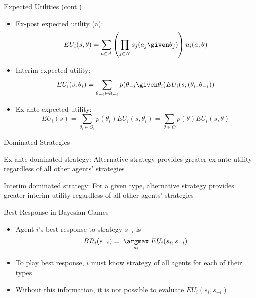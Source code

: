 \documentclass[11pt,aspectratio=169,handout]{beamer}
\begin{document}
  \begin{frame}{Expected Utilities (cont.)}
   \begin{itemize}[<+->]
    \item \alert{Ex-post} expected utility (a):
    $$EU_i(s,\theta) = \sum_{a\in A}\left(\prod_{j\in N}s_j(a_j \given \theta_j)\right) u_i(a,\theta)$$
    \item \alert{Interim} expected utility:
    $$EU_i(s,\theta_i) = \sum_{\theta_{-i}\in \Theta_{-i}} p(\theta_{-i} \given \theta_i) EU_i(s, (\theta_i,\theta_{-i}))$$
    \item \alert{Ex-ante} expected utility:
    $$EU_i(s)=\sum_{\theta_i \in \Theta_i} p(\theta_i) EU_i(s,\theta_i) = \sum_{\theta \in \Theta} p(\theta) EU_i(s, \theta)$$
   \end{itemize}
  \end{frame}
  
  
  \begin{frame}{Dominated Strategies}
   \begin{itemizes}[1.5em]
    \item \alert{Ex-ante dominated strategy}: Alternative strategy provides greater ex ante utility regardless of all other agents' strategies
    \item \alert{Interim dominated strategy}: For a given type, alternative strategy provides greater interim utility regardless of all other agents' strategies
   \end{itemizes}
  \end{frame}


  \begin{frame}{Best Response in Bayesian Games}
   \begin{itemize}
   \setlength{\itemsep}{1.2em}
    \item Agent $i$'s \alert{best response} to strategy $s_{-i}$ is
    $$BR_i(s_{-i}) = \; \underset{s_i}{\argmax} \; EU_i(s_i,s_{-i})$$
    \item To play best response, $i$ must know strategy of \alert{all agents} for \alert{each of their types}
    \item Without this information, it is not possible to evaluate $EU_i(s_i, s_{-i})$
   \end{itemize}
  \end{frame}
  
\end{document}
